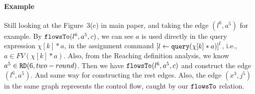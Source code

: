   \paragraph*{Example}
%
Still looking at the Figure~3(c) in main paper, 
and taking the edge $(l^6, a^5)$ for example.
By $\mathtt{flowsTo}(l^6, a^5, c)$, we can see $a$ is used directly in the query expression $\chi[k]*a$,
in the assignment command $\clabel{\assign{l}{\query(\chi[k]*a)}}^l$,
i.e., $a \in FV(\chi[k]*a)$.
Also, from the Reaching definition analysis, we know $a^5 \in \mathtt{RD}(6, two-round)$.
Then we have $\mathtt{flowsTo}(l^6, a^5, c)$ and construct the edge $(l^6, a^5)$.
And same way for constructing the rest edges. Also, the edge $(x^3,j^5)$ in the same graph represents the control flow, caught by our $\mathtt{flowsTo}$ relation.
%

